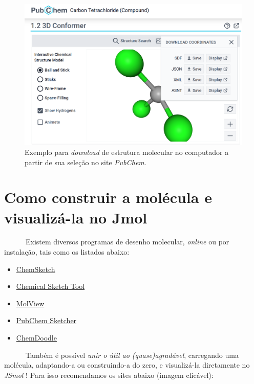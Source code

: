 \documentclass[
  letterpaper,
  DIV=11,
  numbers=noendperiod]{scrreprt}
\providecommand{\tightlist}{%
  \setlength{\itemsep}{0pt}\setlength{\parskip}{0pt}}\usepackage{longtable,booktabs,array}
\begin{document}
\begin{figure}[H]

{\centering \includegraphics{CCl4.png}

}

\caption{Exemplo para \emph{download} de estrutura molecular no
computador a partir de sua seleção no site \emph{PubChem}.}

\end{figure}%

\section{Como construir a molécula e visualizá-la no
Jmol}\label{como-construir-a-moluxe9cula-e-visualizuxe1-la-no-jmol}

~~~~~~Existem diversos programas de desenho molecular, \emph{online} ou
por instalação, tais como os listados abaixo:

\begin{itemize}
\tightlist
\item
  \href{https://www.acdlabs.com/resources/free-chemistry-software-apps/chemsketch-freeware/}{ChemSketch}
\item
  \href{https://www.rcsb.org/chemical-sketch}{Chemical Sketch Tool}
\item
  \href{https://molview.org/}{MolView}
\item
  \href{https://pubchem.ncbi.nlm.nih.gov//edit3/index.html}{PubChem
  Sketcher}
\item
  \href{https://www.chemdoodle.com/}{ChemDoodle}
\end{itemize}

~~~~~~Também é possível \emph{unir o útil ao (quase)agradável},
carregando uma molécula, adaptando-a ou construindo-a do zero, e
visualizá-la diretamente no \emph{JSmol} ! Para isso recomendamos os
sites abaixo (imagem clicável):
\end{document}
